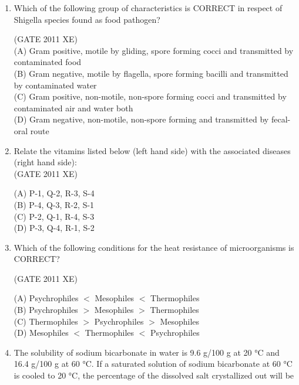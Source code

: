 \documentclass[journal,12pt,onecolumn]{IEEEtran}
\begin{document}
\begin{enumerate}
\begin{enumerate}
\begin{enumerate}
\item Which of the following group of characteristics is CORRECT in respect of Shigella species found as food pathogen?

\hfill{(GATE 2011 XE)} \\

(A) Gram positive, motile by gliding, spore forming cocci and transmitted by contaminated food \\
(B) Gram negative, motile by flagella, spore forming bacilli and transmitted by contaminated water \\
(C) Gram positive, non-motile, non-spore forming cocci and transmitted by contaminated air and water both \\
(D) Gram negative, non-motile, non-spore forming and transmitted by fecal-oral route

\newpage

\item Relate the vitamins listed below (left hand side) with the associated diseases (right hand side):\\




\hfill{(GATE 2011 XE)} \\
\begin{multicols}{4}
(A) P-1, Q-2, R-3, S-4 \\
(B) P-4, Q-3, R-2, S-1 \\
(C) P-2, Q-1, R-4, S-3 \\
(D) P-3, Q-4, R-1, S-2
\end{multicols}

\item Which of the following conditions for the heat resistance of microorganisms is CORRECT?

\hfill{(GATE 2011 XE)} \\
\begin{multicols}{2}
(A) Psychrophiles $<$ Mesophiles $<$ Thermophiles \\
(B) Psychrophiles $>$ Mesophiles $>$ Thermophiles \\
(C) Thermophiles $>$ Psychrophiles $>$ Mesophiles \\
(D) Mesophiles $<$ Thermophiles $<$ Psychrophiles
\end{multicols}

\item The solubility of sodium bicarbonate in water is 9.6 g/100 g at 20 °C and 16.4 g/100 g at 60 °C. If a saturated solution of sodium bicarbonate at 60 °C is cooled to 20 °C, the percentage of the dissolved salt crystallized out will be


\end{enumerate}
\end{enumerate}
\end{enumerate}
\end{document}
